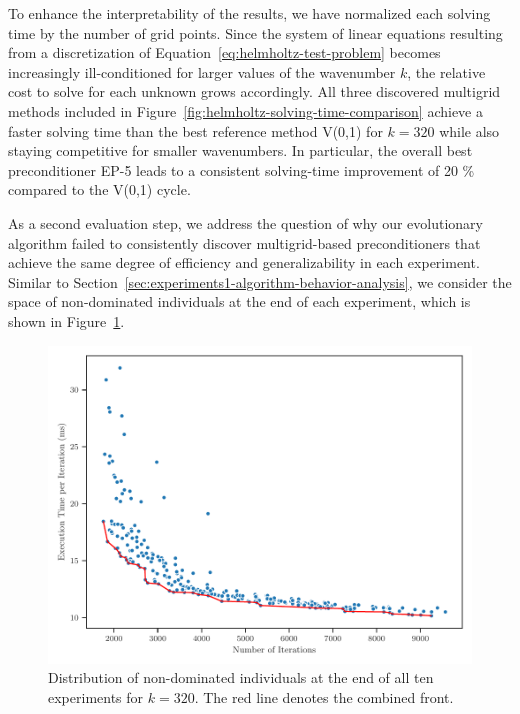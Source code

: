 To enhance the interpretability of the results, we have normalized each solving time by the number of grid points.
Since the system of linear equations resulting from a discretization of Equation~\ref{eq:helmholtz-test-problem} becomes increasingly ill-conditioned for larger values of the wavenumber $k$, the relative cost to solve for each unknown grows accordingly.
All three discovered multigrid methods included in Figure~\ref{fig:helmholtz-solving-time-comparison} achieve a faster solving time than the best reference method V(0,1) for $k = 320$ while also staying competitive for smaller wavenumbers.
In particular, the overall best preconditioner EP-5 leads to a consistent solving-time improvement of 20 \% compared to the V(0,1) cycle.

As a second evaluation step, we address the question of why our evolutionary algorithm failed to consistently discover multigrid-based preconditioners that achieve the same degree of efficiency and generalizability in each experiment.
Similar to Section~\ref{sec:experiments1-algorithm-behavior-analysis}, we consider the space of non-dominated individuals at the end of each experiment, which is shown in Figure~\ref{fig:pareto-front-helmholtz}.
\begin{figure}
\centering
	\includegraphics[scale=0.655]{figures/pareto-front.pdf}
	\caption[2D Helmholtz -- Distribution of non-dominated individuals at the end of all ten experiments]{Distribution of non-dominated individuals at the end of all ten experiments for $k = 320$. The red line denotes the combined front.}
	\label{fig:pareto-front-helmholtz}
\end{figure}
